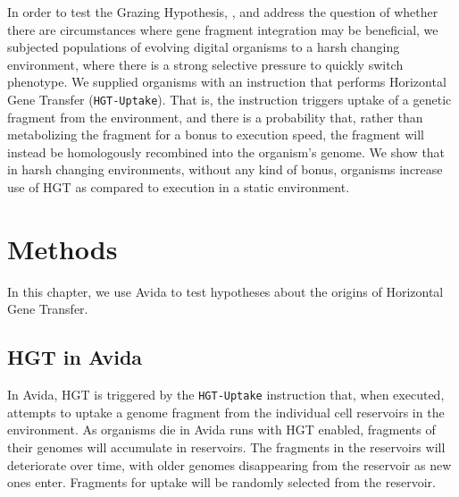 \documentclass[PhD]{msu-thesis}
\begin{document}
In order to test the Grazing Hypothesis,
, and address the question of whether there are circumstances where gene fragment 
integration may be beneficial, we subjected populations of evolving digital organisms to a harsh changing environment,
where there is a strong selective pressure to quickly switch phenotype. We supplied organisms with an instruction that performs Horizontal Gene Transfer (\texttt{HGT-Uptake}).
That is, the instruction triggers uptake of a genetic fragment from the environment, and there is a probability that, rather than metabolizing the fragment for a bonus to execution speed, the fragment will instead be homologously recombined into the organism's genome. We show that in harsh changing environments, without any kind of bonus, organisms increase use of HGT as compared to execution in a static environment.


\section{Methods}
In this chapter, we use Avida to test hypotheses about the origins of Horizontal Gene Transfer. 

\subsection{HGT in Avida}
In Avida, HGT is triggered by the \texttt{HGT-Uptake} instruction that, when executed, attempts to uptake a genome fragment from the individual cell reservoirs in the environment. As organisms die in Avida runs with HGT enabled, fragments of their genomes will accumulate in reservoirs. The fragments in the reservoirs will deteriorate over time, with older genomes disappearing from the reservoir as new ones enter. Fragments for uptake will be randomly selected from the reservoir.  
\end{document}
